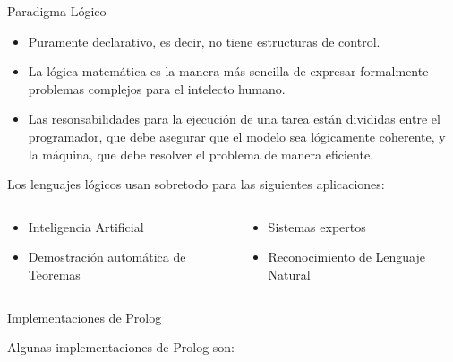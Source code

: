 \documentclass[xcolor=dvipsnames]{beamer}
\begin{document}
\begin{frame}{Paradigma Lógico}

\begin{itemize}
\item Puramente declarativo, es decir, no tiene estructuras de control.
\item La lógica matemática es la manera más sencilla de expresar formalmente problemas complejos para el intelecto humano.
\item Las resonsabilidades para la ejecución de una tarea están divididas entre el programador, que debe asegurar que el modelo sea lógicamente coherente, y la máquina, que debe resolver el problema de manera eficiente.
\end{itemize}

Los lenguajes lógicos usan sobretodo para las siguientes aplicaciones:

\begin{columns}
  \begin{column}{0.45\textwidth}
  \begin{itemize}
    \item Inteligencia Artificial
    \item Demostración automática de Teoremas
  \end{itemize}
  \end{column}

  \begin{column}{0.45\textwidth}
  \begin{itemize}
    \item Sistemas expertos
    \item Reconocimiento de Lenguaje Natural
  \end{itemize}
  \end{column}
\end{columns}

\end{frame}

\begin{frame}[containsverbatim]{Implementaciones de Prolog}

Algunas implementaciones de Prolog son:


\end{frame}
\end{document}
